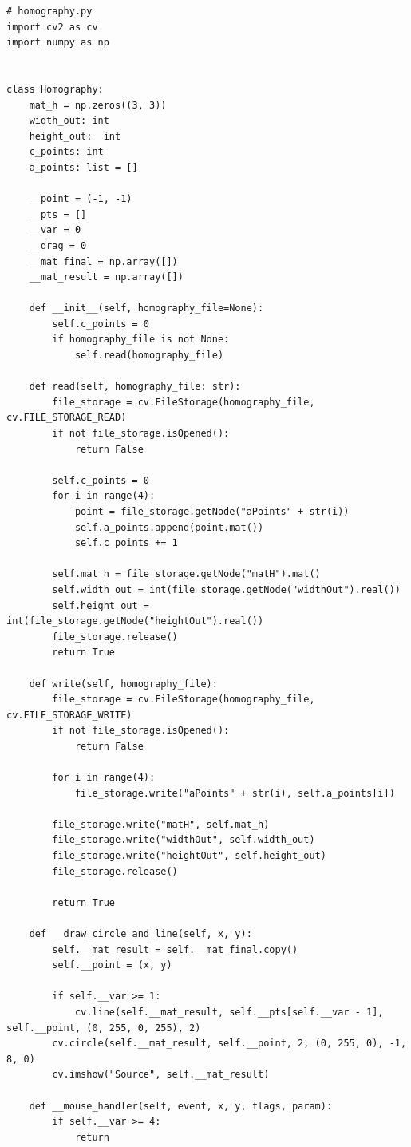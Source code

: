 \documentclass[a4paper, 12pt]{article}
\begin{document}
	\begin{lstlisting}
# homography.py		
import cv2 as cv
import numpy as np


class Homography:
    mat_h = np.zeros((3, 3))
    width_out: int
    height_out:  int
    c_points: int
    a_points: list = []

    __point = (-1, -1)
    __pts = []
    __var = 0
    __drag = 0
    __mat_final = np.array([])
    __mat_result = np.array([])

    def __init__(self, homography_file=None):
        self.c_points = 0
        if homography_file is not None:
            self.read(homography_file)

    def read(self, homography_file: str):
        file_storage = cv.FileStorage(homography_file, cv.FILE_STORAGE_READ)
        if not file_storage.isOpened():
            return False

        self.c_points = 0
        for i in range(4):
            point = file_storage.getNode("aPoints" + str(i))
            self.a_points.append(point.mat())
            self.c_points += 1

        self.mat_h = file_storage.getNode("matH").mat()
        self.width_out = int(file_storage.getNode("widthOut").real())
        self.height_out = int(file_storage.getNode("heightOut").real())
        file_storage.release()
        return True

    def write(self, homography_file):
        file_storage = cv.FileStorage(homography_file, cv.FILE_STORAGE_WRITE)
        if not file_storage.isOpened():
            return False

        for i in range(4):
            file_storage.write("aPoints" + str(i), self.a_points[i])

        file_storage.write("matH", self.mat_h)
        file_storage.write("widthOut", self.width_out)
        file_storage.write("heightOut", self.height_out)
        file_storage.release()

        return True

    def __draw_circle_and_line(self, x, y):
        self.__mat_result = self.__mat_final.copy()
        self.__point = (x, y)

        if self.__var >= 1:
            cv.line(self.__mat_result, self.__pts[self.__var - 1], self.__point, (0, 255, 0, 255), 2)
        cv.circle(self.__mat_result, self.__point, 2, (0, 255, 0), -1, 8, 0)
        cv.imshow("Source", self.__mat_result)

    def __mouse_handler(self, event, x, y, flags, param):
        if self.__var >= 4:
            return


\end{lstlisting}
\end{document}
